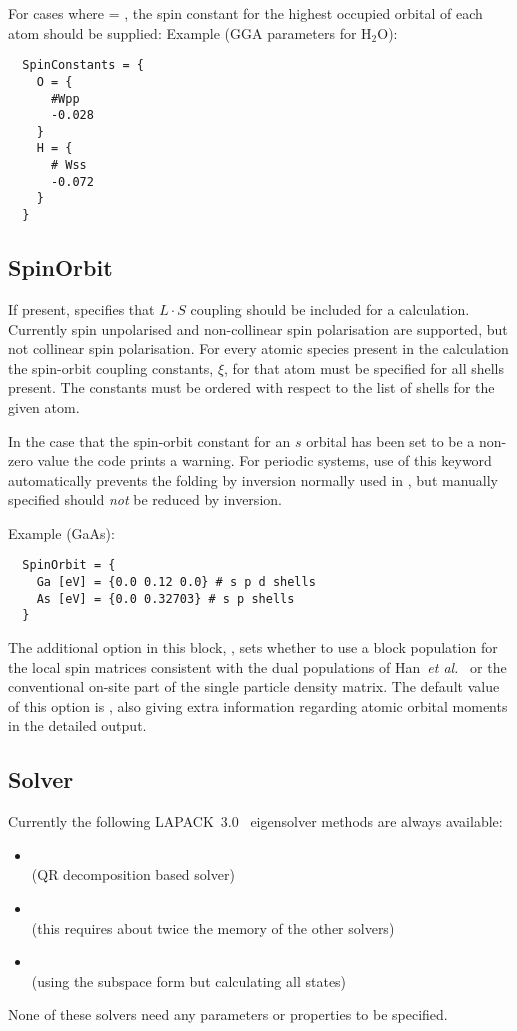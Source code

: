 For cases where  = , the spin constant for the
highest occupied orbital of each atom should be supplied: Example (GGA parameters
for H$_2$O):
\begin{verbatim}
  SpinConstants = {
    O = {
      #Wpp
      -0.028
    }
    H = {
      # Wss
      -0.072
    }
  }
\end{verbatim}

\subsection{SpinOrbit}
\label{sec:dftbp.SpinOrbit}

If present, specifies that $L \cdot S$ coupling should be included for
a calculation. Currently spin unpolarised and non-collinear spin
polarisation are supported, but not collinear spin polarisation. For
every atomic species present in the calculation the spin-orbit
coupling constants, $\xi$, for that atom must be specified for all
shells present.  The constants must be ordered with respect to the
list of shells for the given atom.

In the case that the spin-orbit constant for an $s$ orbital has been
set to be a non-zero value the code prints a warning. For periodic
systems, use of this keyword automatically prevents the folding by
inversion normally used in , but manually
specified  should {\em not} be reduced by
inversion.

Example (GaAs):
\begin{verbatim}
  SpinOrbit = {
    Ga [eV] = {0.0 0.12 0.0} # s p d shells
    As [eV] = {0.0 0.32703} # s p shells
  }
\end{verbatim}

The additional option in this block, , sets whether to use a block
population for the local spin matrices consistent with the dual populations of
Han~{\it et al.}~\cite{han-PRB-73-045110} or the conventional on-site part of
the single particle density matrix. The default value of this option is
, also giving extra information regarding atomic orbital moments in the
detailed output.

\subsection{Solver}
\label{sec:dftbp.Solver}

Currently the following LAPACK~3.0~\cite{lapack3} eigensolver methods are always
available:
\begin{itemize}
\item {}\\ (QR decomposition based solver)
\item {}\\ (this requires about twice the memory of the
  other solvers)
\item {}\\ (using the subspace form but calculating all
  states)
\end{itemize}
None of these solvers need any parameters or properties to be specified.

